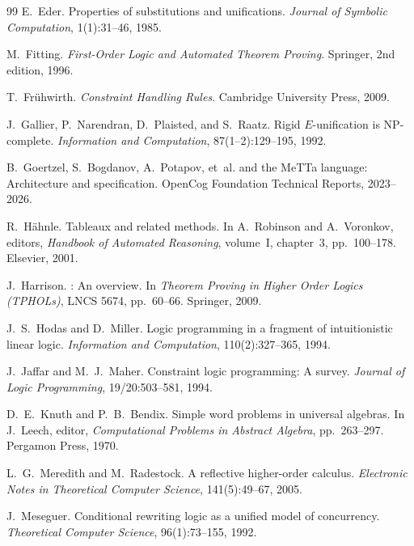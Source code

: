 \documentclass[11pt,a4paper]{article}
\theoremstyle{definition}
\begin{document}
\begin{thebibliography}{99}
E.~Eder.
\newblock Properties of substitutions and unifications.
\newblock \emph{Journal of Symbolic Computation}, 1(1):31--46, 1985.

M.~Fitting.
\newblock \emph{First-Order Logic and Automated Theorem Proving}.
\newblock Springer, 2nd edition, 1996.

T.~Fr\"{u}hwirth.
\newblock \emph{Constraint Handling Rules}.
\newblock Cambridge University Press, 2009.

J.~Gallier, P.~Narendran, D.~Plaisted, and S.~Raatz.
\newblock Rigid {$E$}-unification is {NP}-complete.
\newblock \emph{Information and Computation}, 87(1--2):129--195, 1992.

B.~Goertzel, S.~Bogdanov, A.~Potapov, et~al.
 and the {MeTTa} language: Architecture and specification.
\newblock OpenCog Foundation Technical Reports, 2023--2026.

R.~H\"{a}hnle.
\newblock Tableaux and related methods.
\newblock In A.~Robinson and A.~Voronkov, editors, \emph{Handbook of Automated Reasoning}, volume~I, chapter~3, pp.\ 100--178. Elsevier, 2001.

J.~Harrison.
: An overview.
\newblock In \emph{Theorem Proving in Higher Order Logics (TPHOLs)}, LNCS 5674, pp.\ 60--66. Springer, 2009.

J.~S.~Hodas and D.~Miller.
\newblock Logic programming in a fragment of intuitionistic linear logic.
\newblock \emph{Information and Computation}, 110(2):327--365, 1994.

J.~Jaffar and M.~J.~Maher.
\newblock Constraint logic programming: A survey.
\newblock \emph{Journal of Logic Programming}, 19/20:503--581, 1994.

D.~E.~Knuth and P.~B.~Bendix.
\newblock Simple word problems in universal algebras.
\newblock In J.~Leech, editor, \emph{Computational Problems in Abstract Algebra}, pp.\ 263--297. Pergamon Press, 1970.

L.~G.~Meredith and M.~Radestock.
\newblock A reflective higher-order calculus.
\newblock \emph{Electronic Notes in Theoretical Computer Science}, 141(5):49--67, 2005.

J.~Meseguer.
\newblock Conditional rewriting logic as a unified model of concurrency.
\newblock \emph{Theoretical Computer Science}, 96(1):73--155, 1992.


\end{thebibliography}
\end{document}
